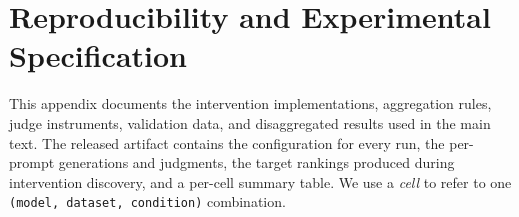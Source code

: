 
%

\section{Reproducibility and Experimental Specification}
\label{sec:appendix-setup}

This appendix documents the intervention implementations, aggregation rules,
judge instruments, validation data, and disaggregated results used in the main
text. The released artifact contains the configuration for every run, the
per-prompt generations and judgments, the target rankings produced during
intervention discovery, and a per-cell summary table. We use a \emph{cell} to
refer to one \texttt{(model, dataset, condition)} combination.

